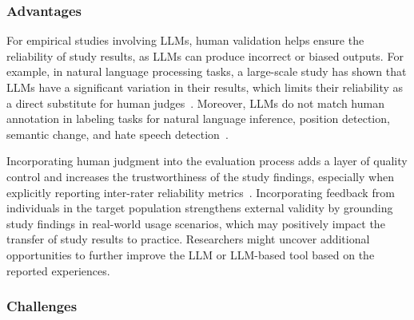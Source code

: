 
\subsubsection{Advantages}

For empirical studies involving LLMs, human validation helps ensure the reliability of study results, as LLMs can produce incorrect or biased outputs.
For example, in natural language processing tasks, a large-scale study has shown that LLMs have a significant variation in their results, which limits their reliability as a direct substitute for human judges~\cite{DBLP:journals/corr/abs-2406-18403}. 
Moreover, LLMs do not match human annotation in labeling tasks for natural language inference, position detection, semantic change, and hate speech detection~\cite{DBLP:conf/chi/Wang0RMM24}.

Incorporating human judgment into the evaluation process adds a layer of quality control and increases the trustworthiness of the study findings, especially when explicitly reporting inter-rater reliability metrics~\cite{khraisha2024canlargelanguagemodelshumans}.
Incorporating feedback from individuals in the target population strengthens external validity by grounding study findings in real-world usage scenarios, which may positively impact the transfer of study results to practice.
Researchers might uncover additional opportunities to further improve the LLM or LLM-based tool based on the reported experiences.

\subsubsection{Challenges}

